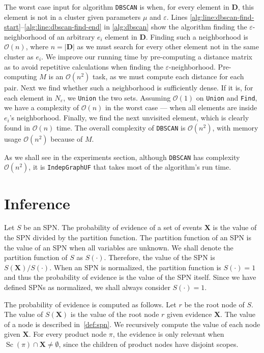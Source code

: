 \documentclass{amsart}
\DeclareMathOperator*{\Sc}{\text{Sc}}
\theoremstyle{plain}
\numberwithin{equation}{section}
\newcommand{\set}[1]{\mathbf{#1}}
\newcommand{\eps}{\varepsilon}
\newcommand{\bigo}{\mathcal{O}}
\newcommand{\code}[1]{\lstinline[mathescape=true]{#1}}
\begin{document}
The worst case input for algorithm \code{DBSCAN} is when, for every element in $\set{D}$, this
element is not in a cluster given parameters $\mu$ and $\eps$. Lines
\ref{alg:line:dbscan-find-start}--\ref{alg:line:dbscan-find-end} in \autoref{alg:dbscan} show the
algorithm finding the $\eps$-neighborhood of an arbitrary $e_i$ element in $\set{D}$. Finding such
a neighborhood is $\bigo(n)$, where $n=|\set{D}|$ as we must search for every other element not in
the same cluster as $e_i$. We improve our running time by pre-computing a distance matrix as to
avoid repetitive calculations when finding the $\eps$-neighborhood. Pre-computing $M$ is an
$\bigo(n^2)$ task, as we must compute each distance for each pair. Next we find whether such a
neighborhood is sufficiently dense. If it is, for each element in $N_\eps$, we \code{Union} the two
sets. Assuming $\bigo(1)$ on \code{Union} and \code{Find}, we have a complexity of $\bigo(n)$ in
the worst case --- when all elements are inside $e_i$'s neighborhood. Finally, we find the next
unvisited element, which is clearly found in $\bigo(n)$ time. The overall complexity of
\code{DBSCAN} is $\bigo(n^2)$, with memory usage $\bigo(n^2)$ because of $M$.

As we shall see in the experiments section, although \code{DBSCAN} has complexity $\bigo(n^2)$, it
is \code{IndepGraphUF} that takes most of the algorithm's run time.

\section{Inference}

Let $S$ be an SPN\@. The probability of evidence of a set of events $\set{X}$ is the value of the
SPN divided by the partition function. The partition function of an SPN is the value of an SPN when
all variables are unknown. We shall denote the partition function of $S$ as $S(\cdot)$. Therefore,
the value of the SPN is $S(\set{X})/S(\cdot)$. When an SPN is normalized, the partition function is
$S(\cdot)=1$ and thus the probability of evidence is the value of the SPN itself. Since we have
defined SPNs as normalized, we shall always consider $S(\cdot)=1$.

The probability of evidence is computed as follows. Let $r$ be the root node of $S$. The value of
$S(\set{X})$ is the value of the root node $r$ given evidence $\set{X}$. The value of a node is
described in~\autoref{def:spn}. We recursively compute the value of each node given $\set{X}$. For
every product node $\pi$, the evidence is only relevant when $\Sc(\pi)\cap\set{X}\neq\emptyset$,
since the children of product nodes have disjoint scopes.
\end{document}
